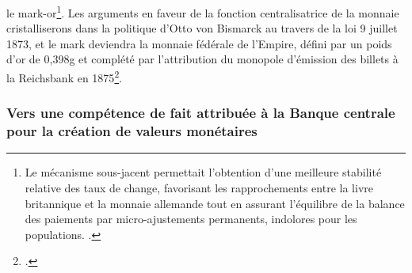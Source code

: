 {le mark-or\footnote{Le mécanisme sous-jacent permettait l'obtention d'une meilleure stabilité relative des taux de change, favorisant les rapprochements entre la livre britannique et la monnaie allemande tout en assurant l'équilibre de la balance des paiements par micro-ajustements permanents, indolores pour les populations. .}. Les arguments en faveur de la fonction centralisatrice de la monnaie cristalliserons dans la politique d'Otto von Bismarck au travers de la loi 9 juillet 1873, et le mark deviendra la monnaie fédérale de l'Empire, défini par un poids d'or de 0,398g et complété par l'attribution du monopole d'émission des billets à la Reichsbank en 1875\footnote{.}.\par
 
 \subsubsection{Vers une compétence de fait attribuée à la Banque centrale pour la création de valeurs monétaires}
 
}
